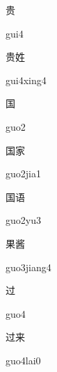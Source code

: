 \begin{multicols*}{2}
\begin{verbete}[gui4]{贵}
\begin{pronuncia}{gui4}
\end{pronuncia}
\end{verbete}

\begin{verbete}{贵姓}
\begin{pronuncia}{gui4xing4}
\end{pronuncia}
\end{verbete}

\begin{verbete}[guo2]{国}
\begin{pronuncia}{guo2}
\end{pronuncia}
\end{verbete}

\begin{verbete}{国家}
\begin{pronuncia}{guo2jia1}
\end{pronuncia}
\end{verbete}

\begin{verbete}[guo2yu3]{国语}
\begin{pronuncia}{guo2yu3}
\end{pronuncia}
\end{verbete}

\begin{verbete}{果酱}
\begin{pronuncia}{guo3jiang4}
\end{pronuncia}
\end{verbete}

\begin{verbete}[guo4]{过}
\begin{pronuncia}{guo4}
\end{pronuncia}
\end{verbete}

\begin{verbete}{过来}
\begin{pronuncia}{guo4lai0}
\end{pronuncia}
\end{verbete}


\end{multicols*}
